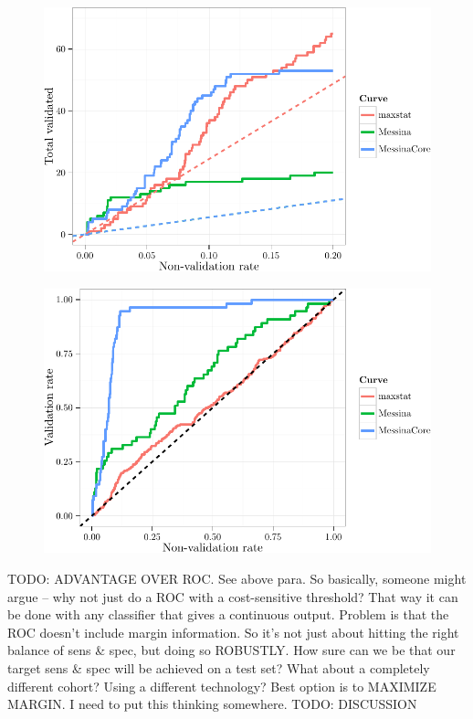 \documentclass[dissertation.tex]{subfiles}
\begin{document}
\begin{figure}[!htbp]
\centering
\includegraphics[width=.7\linewidth]{analysis/messina/figure/07-E3-E3-val-detcurves-1}
\caption[]{}\label{fig:mess-val-detabs}
\end{figure}

\begin{figure}[!htbp]
\centering
\includegraphics[width=.7\linewidth]{analysis/messina/figure/07-E3-E3-val-detcurves-2}
\caption[]{}\label{fig:mess-val-detrel}
\end{figure}


TODO: ADVANTAGE OVER ROC.  See above para.  So basically, someone might argue -- why not just do a ROC with a cost-sensitive threshold?  That way it can be done with any classifier that gives a continuous output.  Problem is that the ROC doesn't include margin information.  So it's not just about hitting the right balance of sens & spec, but doing so ROBUSTLY.  How sure can we be that our target sens & spec will be achieved on a test set?  What about a completely different cohort?  Using a different technology?  Best option is to MAXIMIZE MARGIN.  I need to put this thinking somewhere.  TODO: DISCUSSION
\end{document}
